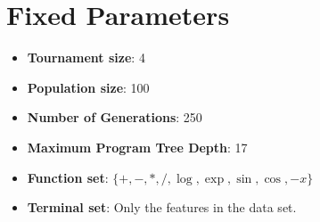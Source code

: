 \chapter{Fixed Parameters}
\label{appendix:fixed_parameters}

\begin{itemize}
\item \textbf{Tournament size}: 4
\item \textbf{Population size}: 100
\item \textbf{Number of Generations}: 250
\item \textbf{Maximum Program Tree Depth}: 17
\item \textbf{Function set}: $\{ +, -, *, /, \log, \exp, \sin, \cos, -x \}$
\item \textbf{Terminal set}: Only the features in the data set.
\end{itemize}